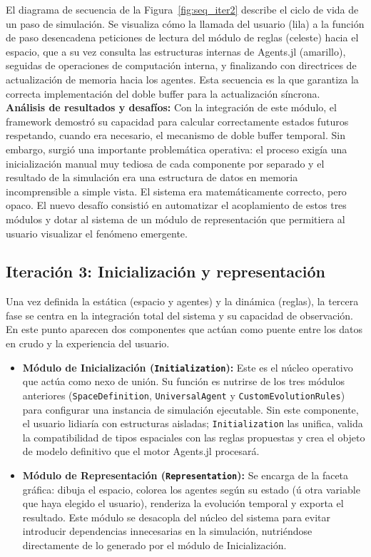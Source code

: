 \documentclass[runningheads]{llncs}
\begin{document}
El diagrama de secuencia de la Figura~\ref{fig:seq_iter2} describe el ciclo de vida de un paso de simulación. Se visualiza cómo la llamada del usuario (lila) a la función de paso desencadena peticiones de lectura del módulo de reglas (celeste) hacia el espacio, que a su vez consulta las estructuras internas de Agents.jl (amarillo), seguidas de operaciones de computación interna, y finalizando con directrices de actualización de memoria hacia los agentes. Esta secuencia es la que garantiza la correcta implementación del doble buffer para la actualización síncrona.\\


\textbf{Análisis de resultados y desafíos:} Con la integración de este módulo, el framework demostró su capacidad para calcular correctamente estados futuros respetando, cuando era necesario, el mecanismo de doble buffer temporal. Sin embargo, surgió una importante problemática operativa: el proceso exigía una inicialización manual muy tediosa de cada componente por separado y el resultado de la simulación era una estructura de datos en memoria incomprensible a simple vista. El sistema era matemáticamente correcto, pero opaco. El nuevo desafío consistió en automatizar el acoplamiento de estos tres módulos y dotar al sistema de un módulo de representación que permitiera al usuario visualizar el fenómeno emergente.

\subsection{Iteración 3: Inicialización y representación}
Una vez definida la estática (espacio y agentes) y la dinámica (reglas), la tercera fase se centra en la integración total del sistema y su capacidad de observación. En este punto aparecen dos componentes que actúan como puente entre los datos en crudo y la experiencia del usuario.

\begin{itemize}
    \item \textbf{Módulo de Inicialización (\texttt{Initialization}):} Este es el núcleo operativo que actúa como nexo de unión. Su función es nutrirse de los tres módulos anteriores (\texttt{SpaceDefinition}, \texttt{UniversalAgent} y \texttt{CustomEvolutionRules}) para configurar una instancia de simulación ejecutable. Sin este componente, el usuario lidiaría con estructuras aisladas; \texttt{Initialization} las unifica, valida la compatibilidad de tipos espaciales con las reglas propuestas y crea el objeto de modelo definitivo que el motor Agents.jl procesará.
    \item \textbf{Módulo de Representación (\texttt{Representation}):} Se encarga de la faceta gráfica: dibuja el espacio, colorea los agentes según su estado (ú otra variable que haya elegido el usuario), renderiza la evolución temporal y exporta el resultado. Este módulo se desacopla del núcleo del sistema para evitar introducir dependencias innecesarias en la simulación, nutriéndose directamente de lo generado por el módulo de Inicialización.
\end{itemize}
\end{document}
